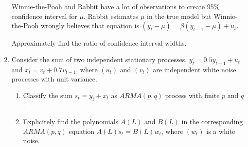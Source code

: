 \documentclass[12pt]{article}
\begin{document}
\begin{enumerate}
Winnie-the-Pooh and Rabbit have a lot of observations to create 95\% confidence interval for $\mu$.
Rabbit estimates $\mu$ in the true model but Winnie-the-Pooh wrongly believes that equation is 
$(y_t - \mu) = \beta (y_{t-1} - \mu) + u_t$.

Approximately find the ratio of confidence interval widths. 

\item Consider the sum of two independent stationary processes, 
$y_t = 0.5 y_{t-1} + u_t$  and $x_t = v_t + 0.7 v_{t-1}$,
where $(u_t)$ and $(v_t)$ are independent white noise processes with unit variance. 
\begin{enumerate}
    \item Classify the sum $s_t = y_t + x_t$ as $ARMA(p, q)$ process with finite $p$ and $q$. 
    \item Explicitely find the polynomials $A(L)$ and $B(L)$ in the corresponding $ARMA(p, q)$ equation
    $A(L) s_t = B(L) w_t$,
    where $(w_t)$ is a white noise. 
\end{enumerate}


\end{enumerate}
\end{document}
